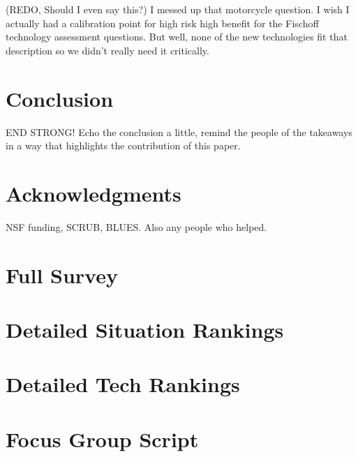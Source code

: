 \documentclass{acm_proc_article-sp}
\begin{document}
(REDO, Should I even say this?) I messed up that motorcycle question. I wish I actually had a calibration point for high risk high benefit for the Fischoff technology assessment questions. But well, none of the new technologies fit that description so we didn't really need it critically. 


\section{Conclusion}
END STRONG! Echo the conclusion a little, remind the people of the takeaways in a way that highlights the contribution of this paper. 



\section{Acknowledgments}
NSF funding, SCRUB, BLUES. Also any people who helped.







\appendix
\section{Full Survey}
\section{Detailed Situation Rankings}
\section{Detailed Tech Rankings}
\section{Focus Group Script}

\balancecolumns

\end{document}
